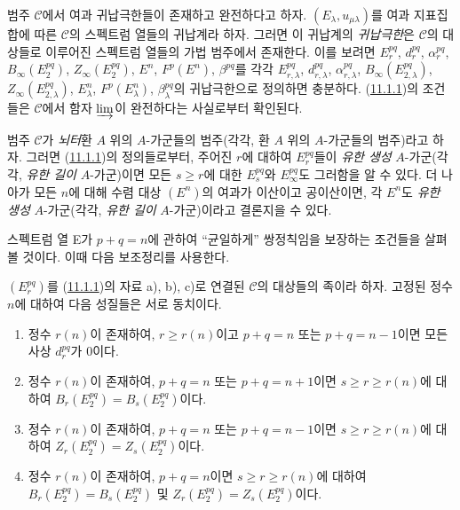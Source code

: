 \begin{env}[11.1.7]
\label{0.11.1.7-fr}
범주 $\mathcal C$에서 여과 귀납극한들이 존재하고 완전하다고 하자.
$(E_\lambda,u_{\mu\lambda})$를 여과 지표집합에 따른 $\mathcal C$의
스펙트럼 열들의 귀납계라 하자. 그러면 이 귀납계의 \emph{귀납극한}은
$\mathcal C$의 대상들로 이루어진 스펙트럼 열들의 가법 범주에서
존재한다. 이를 보려면 $E_r^{pq}$, $d_r^{pq}$, $\alpha_r^{pq}$,
$B_\infty(E_2^{pq})$, $Z_\infty(E_2^{pq})$, $E^n$, $F^p(E^n)$,
$\beta^{pq}$를 각각 $E_{r,\lambda}^{pq}$, $d_{r,\lambda}^{pq}$,
$\alpha_{r,\lambda}^{pq}$, $B_\infty(E_{2,\lambda}^{pq})$,
$Z_\infty(E_{2,\lambda}^{pq})$, $E_\lambda^n$,
$F^p(E_\lambda^n)$, $\beta_\lambda^{pq}$의 귀납극한으로 정의하면
충분하다. (\hyperref[0.11.1.1-fr]{11.1.1})의 조건들은 $\mathcal C$에서
함자 $\varinjlim$이 완전하다는 사실로부터 확인된다.
\end{env}

\begin{remark}[11.1.8]
\label{0.11.1.8-fr}
범주 $\mathcal C$가 \emph{뇌터}환 $A$ 위의 $A$-가군들의 범주(각각,
환 $A$ 위의 $A$-가군들의 범주)라고 하자. 그러면
(\hyperref[0.11.1.1-fr]{11.1.1})의 정의들로부터, 주어진 $r$에 대하여
$E_r^{pq}$들이 \emph{유한 생성} $A$-가군(각각, \emph{유한 길이}
$A$-가군)이면 모든 $s\geq r$에 대한 $E_s^{pq}$와
$E_\infty^{pq}$도 그러함을 알 수 있다. 더 나아가 모든 $n$에 대해
수렴 대상 $(E^n)$의 여과가 이산이고 공이산이면, 각 $E^n$도
\emph{유한 생성} $A$-가군(각각, \emph{유한 길이} $A$-가군)이라고
결론지을 수 있다.
\end{remark}

\begin{env}[11.1.9]
\label{0.11.1.9-fr}
스펙트럼 열 E가 $p+q=n$에 관하여 ``균일하게'' 쌍정칙임을 보장하는
조건들을 살펴볼 것이다. 이때 다음 보조정리를 사용한다.
\end{env}

\begin{lemma}[11.1.10]
\label{0.11.1.10-fr}
$(E_r^{pq})$를 (\hyperref[0.11.1.1-fr]{11.1.1})의 자료 a), b), c)로
연결된 $\mathcal C$의 대상들의 족이라 하자. 고정된 정수 $n$에 대하여
다음 성질들은 서로 동치이다.
\begin{enumerate}
  \item[(a)] 정수 $r(n)$이 존재하여, $r\geq r(n)$이고 $p+q=n$ 또는
    $p+q=n-1$이면 모든 사상 $d_r^{pq}$가 0이다.
  \item[(b)] 정수 $r(n)$이 존재하여, $p+q=n$ 또는 $p+q=n+1$이면
    $s\geq r\geq r(n)$에 대하여
    $B_r(E_2^{pq})=B_s(E_2^{pq})$이다.
  \item[(c)] 정수 $r(n)$이 존재하여, $p+q=n$ 또는 $p+q=n-1$이면
    $s\geq r\geq r(n)$에 대하여
    $Z_r(E_2^{pq})=Z_s(E_2^{pq})$이다.
  \item[(d)] 정수 $r(n)$이 존재하여, $p+q=n$이면
    $s\geq r\geq r(n)$에 대하여
    $B_r(E_2^{pq})=B_s(E_2^{pq})$ 및
    $Z_r(E_2^{pq})=Z_s(E_2^{pq})$이다.
\end{enumerate}
\end{lemma}

